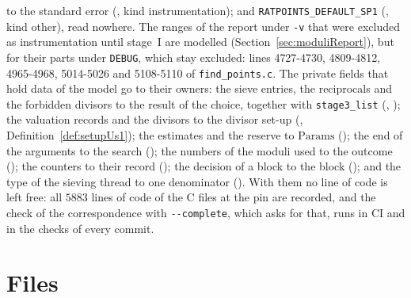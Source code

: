 to the standard error (, kind instrumentation); and
\verb|RATPOINTS_DEFAULT_SP1| (, kind other), read nowhere. The ranges
of the report under \verb|-v| that were excluded as instrumentation until stage~I are modelled
(Section~\ref{sec:moduliReport}), but for their parts under \verb|DEBUG|, which stay excluded: lines
4727-4730, 4809-4812, 4965-4968, 5014-5026 and 5108-5110 of \verb|find_points.c|. The private fields
that hold data of the model go to their owners: the sieve entries, the reciprocals and the forbidden
divisors to the result of the choice, together with \verb|stage3_list|
(, ); the valuation records and the
divisors to the divisor set-up (, Definition~\ref{def:setupUs1}); the
estimates and the reserve to $\mathrm{Params}$ (); the end of the
arguments to the search (); the numbers of the moduli used to the
outcome (); the counters to their record
(); the decision of a block to the block
(); and the type of the sieving thread to one denominator
(). With them no line of code is left free: all $5883$ lines of code
of the C files at the pin are recorded, and the check of the correspondence with \verb|--complete|,
which asks for that, runs in CI and in the checks of every commit.

\section{Files}\label{sec:moduliFiles}

